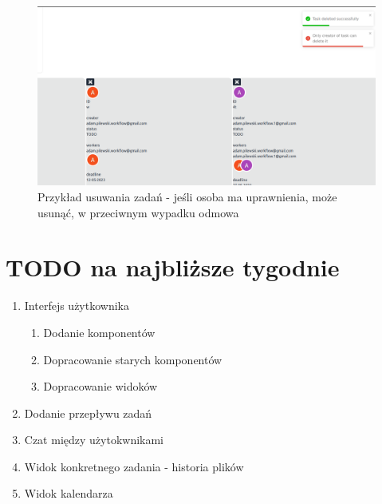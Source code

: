 \documentclass[a4paper, 12pt]{article}
\begin{document}
\begin{figure}[H]
	\centering
    \includegraphics*[scale=0.3]{img/delete-task.png}
	\caption{Przykład usuwania zadań - jeśli osoba ma uprawnienia, może usunąć, w przeciwnym wypadku odmowa}
\end{figure}
\section{TODO na najbliższe tygodnie}
\begin{enumerate}
    \item Interfejs użytkownika \begin{enumerate}
        \item Dodanie komponentów
        \item Dopracowanie starych komponentów
        \item Dopracowanie widoków
    \end{enumerate}
        \item Dodanie przepływu zadań
        \item Czat między użytokwnikami
        \item Widok konkretnego zadania - historia plików
        \item Widok kalendarza
\end{enumerate}


\end{document}
